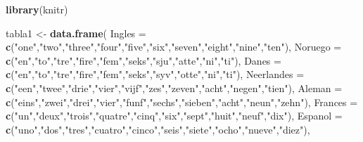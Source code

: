 \documentclass[
]{book}
\newenvironment{Shaded}{\begin{snugshade}}{\end{snugshade}}
\newcommand{\AttributeTok}[1]{\textcolor[rgb]{0.13,0.29,0.53}{#1}}
\newcommand{\FunctionTok}[1]{\textcolor[rgb]{0.13,0.29,0.53}{\textbf{#1}}}
\newcommand{\NormalTok}[1]{#1}
\newcommand{\OtherTok}[1]{\textcolor[rgb]{0.56,0.35,0.01}{#1}}
\newcommand{\StringTok}[1]{\textcolor[rgb]{0.31,0.60,0.02}{#1}}
\begin{document}
\begin{Shaded}
\begin{Highlighting}[]
\FunctionTok{library}\NormalTok{(knitr)}

\NormalTok{tabla1 }\OtherTok{\textless{}{-}} \FunctionTok{data.frame}\NormalTok{(}
  \AttributeTok{Ingles =} \FunctionTok{c}\NormalTok{(}\StringTok{"one"}\NormalTok{,}\StringTok{"two"}\NormalTok{,}\StringTok{"three"}\NormalTok{,}\StringTok{"four"}\NormalTok{,}\StringTok{"five"}\NormalTok{,}\StringTok{"six"}\NormalTok{,}\StringTok{"seven"}\NormalTok{,}\StringTok{"eight"}\NormalTok{,}\StringTok{"nine"}\NormalTok{,}\StringTok{"ten"}\NormalTok{),}
  \AttributeTok{Noruego =} \FunctionTok{c}\NormalTok{(}\StringTok{"en"}\NormalTok{,}\StringTok{"to"}\NormalTok{,}\StringTok{"tre"}\NormalTok{,}\StringTok{"fire"}\NormalTok{,}\StringTok{"fem"}\NormalTok{,}\StringTok{"seks"}\NormalTok{,}\StringTok{"sju"}\NormalTok{,}\StringTok{"atte"}\NormalTok{,}\StringTok{"ni"}\NormalTok{,}\StringTok{"ti"}\NormalTok{),}
  \AttributeTok{Danes =} \FunctionTok{c}\NormalTok{(}\StringTok{"en"}\NormalTok{,}\StringTok{"to"}\NormalTok{,}\StringTok{"tre"}\NormalTok{,}\StringTok{"fire"}\NormalTok{,}\StringTok{"fem"}\NormalTok{,}\StringTok{"seks"}\NormalTok{,}\StringTok{"syv"}\NormalTok{,}\StringTok{"otte"}\NormalTok{,}\StringTok{"ni"}\NormalTok{,}\StringTok{"ti"}\NormalTok{),}
  \AttributeTok{Neerlandes =} \FunctionTok{c}\NormalTok{(}\StringTok{"een"}\NormalTok{,}\StringTok{"twee"}\NormalTok{,}\StringTok{"drie"}\NormalTok{,}\StringTok{"vier"}\NormalTok{,}\StringTok{"vijf"}\NormalTok{,}\StringTok{"zes"}\NormalTok{,}\StringTok{"zeven"}\NormalTok{,}\StringTok{"acht"}\NormalTok{,}\StringTok{"negen"}\NormalTok{,}\StringTok{"tien"}\NormalTok{),}
  \AttributeTok{Aleman =} \FunctionTok{c}\NormalTok{(}\StringTok{"eins"}\NormalTok{,}\StringTok{"zwei"}\NormalTok{,}\StringTok{"drei"}\NormalTok{,}\StringTok{"vier"}\NormalTok{,}\StringTok{"funf"}\NormalTok{,}\StringTok{"sechs"}\NormalTok{,}\StringTok{"sieben"}\NormalTok{,}\StringTok{"acht"}\NormalTok{,}\StringTok{"neun"}\NormalTok{,}\StringTok{"zehn"}\NormalTok{),}
  \AttributeTok{Frances =} \FunctionTok{c}\NormalTok{(}\StringTok{"un"}\NormalTok{,}\StringTok{"deux"}\NormalTok{,}\StringTok{"trois"}\NormalTok{,}\StringTok{"quatre"}\NormalTok{,}\StringTok{"cinq"}\NormalTok{,}\StringTok{"six"}\NormalTok{,}\StringTok{"sept"}\NormalTok{,}\StringTok{"huit"}\NormalTok{,}\StringTok{"neuf"}\NormalTok{,}\StringTok{"dix"}\NormalTok{),}
  \AttributeTok{Espanol =} \FunctionTok{c}\NormalTok{(}\StringTok{"uno"}\NormalTok{,}\StringTok{"dos"}\NormalTok{,}\StringTok{"tres"}\NormalTok{,}\StringTok{"cuatro"}\NormalTok{,}\StringTok{"cinco"}\NormalTok{,}\StringTok{"seis"}\NormalTok{,}\StringTok{"siete"}\NormalTok{,}\StringTok{"ocho"}\NormalTok{,}\StringTok{"nueve"}\NormalTok{,}\StringTok{"diez"}\NormalTok{),}

\end{Highlighting}
\end{Shaded}
\end{document}

